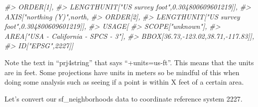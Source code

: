 \documentclass[
  12pt,
]{book}
\newenvironment{Shaded}{\begin{snugshade}}{\end{snugshade}}
\newcommand{\CommentTok}[1]{\textcolor[rgb]{0.37,0.37,0.37}{\textit{#1}}}
\begin{document}
\begin{Shaded}
\begin{Highlighting}[]
\CommentTok{\#\textgreater{}             ORDER[1],}
\CommentTok{\#\textgreater{}             LENGTHUNIT["US survey foot",0.304800609601219]],}
\CommentTok{\#\textgreater{}         AXIS["northing (Y)",north,}
\CommentTok{\#\textgreater{}             ORDER[2],}
\CommentTok{\#\textgreater{}             LENGTHUNIT["US survey foot",0.304800609601219]],}
\CommentTok{\#\textgreater{}     USAGE[}
\CommentTok{\#\textgreater{}         SCOPE["unknown"],}
\CommentTok{\#\textgreater{}         AREA["USA {-} California {-} SPCS {-} 3"],}
\CommentTok{\#\textgreater{}         BBOX[36.73,{-}123.02,38.71,{-}117.83]],}
\CommentTok{\#\textgreater{}     ID["EPSG",2227]]}
\end{Highlighting}
\end{Shaded}

Note the text in ``prj4string'' that says ``+units=us-ft''. This means that the units are in feet. Some projections have units in meters so be mindful of this when doing some analysis such as seeing if a point is within X feet of a certain area.

Let's convert our sf\_neighborhoods data to coordinate reference system 2227.
\end{document}
